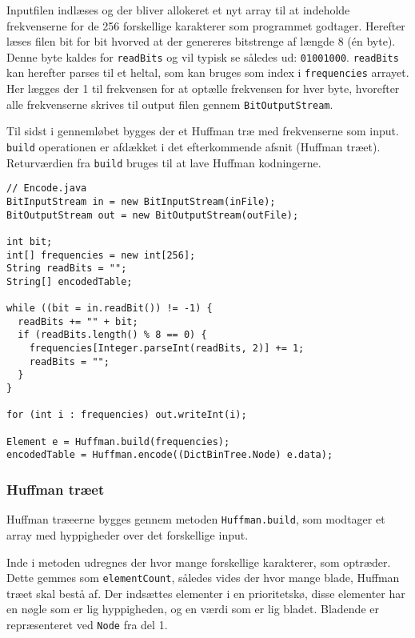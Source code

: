 \documentclass{article}
\begin{document}
Inputfilen indlæses og der bliver allokeret et nyt array til at indeholde frekvenserne for de 256 forskellige karakterer som programmet godtager. Herefter læses filen bit for bit hvorved at der genereres bitstrenge af længde 8 (én byte). Denne byte kaldes for \texttt{readBits} og vil typisk se således ud: \texttt{01001000}. \texttt{readBits} kan herefter parses til et heltal, som kan bruges som index i \texttt{frequencies} arrayet. Her lægges der 1 til frekvensen for at optælle frekvensen for hver byte, hvorefter alle frekvenserne skrives til output filen gennem \texttt{BitOutputStream}.

Til sidst i gennemløbet bygges der et Huffman træ med frekvenserne som input. \texttt{build} operationen er afdækket i det efterkommende afsnit (Huffman træet).
Returværdien fra \texttt{build} bruges til at lave Huffman kodningerne.

\begin{lstlisting}
// Encode.java
BitInputStream in = new BitInputStream(inFile);
BitOutputStream out = new BitOutputStream(outFile);

int bit;
int[] frequencies = new int[256];
String readBits = "";
String[] encodedTable;

while ((bit = in.readBit()) != -1) {
  readBits += "" + bit;
  if (readBits.length() % 8 == 0) {
    frequencies[Integer.parseInt(readBits, 2)] += 1;
    readBits = "";
  }
}

for (int i : frequencies) out.writeInt(i);

Element e = Huffman.build(frequencies);
encodedTable = Huffman.encode((DictBinTree.Node) e.data);
\end{lstlisting}

\newpage
\subsubsection*{Huffman træet}
Huffman træeerne bygges gennem metoden \texttt{Huffman.build}, som modtager et array med hyppigheder over det forskellige input.

Inde i metoden udregnes der hvor mange forskellige karakterer, som optræder. Dette gemmes som \texttt{elementCount}, således vides der hvor mange blade, Huffman træet skal bestå af. Der indsættes elementer i en prioritetskø, disse elementer har en nøgle som er lig hyppigheden, og en værdi som er lig bladet. Bladende er repræsenteret ved \texttt{Node} fra del 1.
\end{document}
